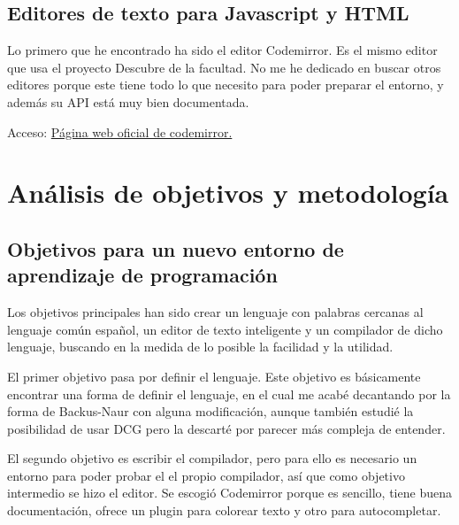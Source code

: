 \documentclass{report}
\begin{document}
	\section{Editores de texto para Javascript y HTML}
	
	Lo primero que he encontrado ha sido el editor Codemirror. Es el mismo editor que usa el proyecto Descubre de la facultad. No me he dedicado en buscar otros editores porque este tiene
	todo lo que necesito para poder preparar el entorno, y además su API está muy bien documentada\cite{codemirrorapi}.
	
	Acceso:
	\href{http://codemirror.net/}{Página web oficial de codemirror.}
	
	\chapter{Análisis de objetivos y metodología}
	
	
	\section{Objetivos para un nuevo entorno de aprendizaje de programación}
	
	Los objetivos principales han sido crear un lenguaje con palabras cercanas al lenguaje común español, un editor de texto inteligente y un compilador de dicho lenguaje, buscando en la medida de lo posible la facilidad y la utilidad. 
	
	\vspace{10px}
	
	El primer objetivo pasa por definir el lenguaje. Este objetivo es básicamente encontrar una forma de definir el lenguaje, en el cual me acabé decantando por la forma de Backus-Naur\cite{bnf} con alguna modificación, aunque también estudié la posibilidad de usar DCG\cite{dcg} pero la descarté por parecer más compleja de entender. 
	
	\vspace{10px}

	El segundo objetivo es escribir el compilador, pero para ello es necesario un entorno para poder probar el el propio compilador, así que como objetivo intermedio se hizo el editor. Se escogió Codemirror porque es sencillo, tiene buena documentación, ofrece un plugin para colorear texto\cite{codemirrorsyntaxhighlight} y otro para autocompletar\cite{codemirrorautocomplete}. 
	
	\vspace{10px}
	
\end{document}
